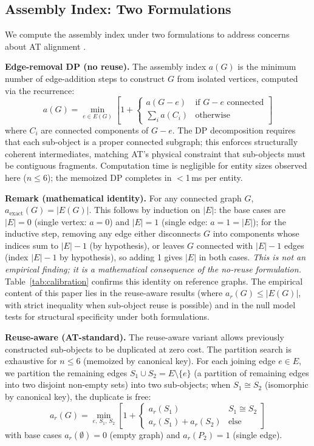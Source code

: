 \documentclass[letterpaper]{article}
\begin{document}
\subsection{Assembly Index: Two Formulations}
\label{sec:methods:assembly}

We compute the assembly index under two formulations to address concerns
about AT alignment \citep{uthamacumaran2024assembly}.

\textbf{Edge-removal DP (no reuse).} The assembly index $a(G)$ is the
minimum number of edge-addition steps to construct $G$ from isolated
vertices, computed via the recurrence:
\begin{equation}
    a(G) = \min_{e \in E(G)} \left[1 + \begin{cases}
        a(G - e) & \text{if } G - e \text{ connected} \\
        \sum_i a(C_i) & \text{otherwise}
    \end{cases}\right]
\end{equation}
where $C_i$ are connected components of $G - e$.
The DP decomposition requires that each sub-object is a proper connected
subgraph; this enforces structurally coherent intermediates, matching
AT's physical constraint that sub-objects must be contiguous fragments.
Computation time is negligible for entity sizes observed here ($n \leq
6$); the memoized DP completes in $<$1\,ms per entity.

\textbf{Remark (mathematical identity).}
For any connected graph $G$, $a_{\text{exact}}(G) = |E(G)|$.
This follows by induction on $|E|$: the base cases are $|E|=0$
(single vertex: $a=0$) and $|E|=1$ (single edge: $a=1=|E|$); for the
inductive step, removing any edge either disconnects $G$ into components
whose indices sum to $|E|-1$ (by hypothesis), or leaves $G$ connected
with $|E|-1$ edges (index $|E|-1$ by hypothesis), so adding 1 gives
$|E|$ in both cases.
\emph{This is not an empirical finding; it is a mathematical consequence
of the no-reuse formulation.} Table~\ref{tab:calibration} confirms this
identity on reference graphs. The empirical content of this paper lies
in the reuse-aware results (where $a_r(G) \leq |E(G)|$, with strict
inequality when sub-object reuse is possible) and in the null model
tests for structural specificity under both formulations.

\textbf{Reuse-aware (AT-standard).} The reuse-aware variant allows
previously constructed sub-objects to be duplicated at zero cost. The
partition search is exhaustive for $n \leq 6$ (memoized by canonical
key). For each joining edge $e \in E$, we partition the remaining edges
$S_1 \cup S_2 = E \setminus \{e\}$ (a partition of remaining edges
into two disjoint non-empty sets) into two sub-objects; when $S_1 \cong S_2$
(isomorphic by canonical key), the duplicate is free:
\begin{equation}
    a_r(G) = \min_{e,\, S_1,\, S_2}
    \left[1 + \begin{cases}
        a_r(S_1) & S_1 \cong S_2 \\
        a_r(S_1) + a_r(S_2) & \text{else}
    \end{cases}\right]
\end{equation}
with base cases $a_r(\emptyset) = 0$ (empty graph) and $a_r(P_2) = 1$
(single edge).
\end{document}
